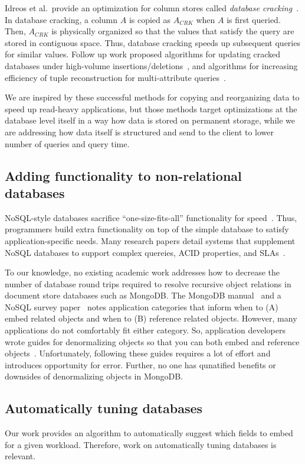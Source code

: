Idreos et al.~provide an optimization for column stores called {\em database cracking}~\cite{Pirk2007}.
In database cracking, a column $A$ is copied as $A_{CRK}$ when $A$ is first queried.
Then, $A_{CRK}$ is physically organized so that the values that satisfy the query are stored in contiguous space.
Thus, database cracking speeds up subsequent queries for similar values.
Follow up work proposed algorithms for updating cracked databases under high-volume insertions/deletions~\cite{Idreos2007}, and algorithms for increasing efficiency of tuple reconstruction for multi-attribute queries~\cite{Idreos2009}.

We are inspired by these successful methods for copying and reorganizing data to speed up read-heavy applications, but those methods target optimizations at the database level itself in a way how data is stored on permanent storage, while we are addressing how data itself is structured and send to the client to lower number of queries and query time.

\subsection{Adding functionality to non-relational databases} 

NoSQL-style databases sacrifice ``one-size-fits-all'' functionality for speed~\cite{Strauch}.
Thus, programmers build extra functionality on top of the simple database to satisfy application-specific needs.
Many research papers detail systems that supplement NoSQL databases to support complex quereies, ACID properties, and SLAs~\cite{Decandia2007,Chang,Beaver2010,Baker}. 

To our knowledge, no existing academic work addresses how to decrease the number of database round trips required to resolve recursive object relations in document store databases such as MongoDB.
The MongoDB manual~\cite{MongoDB2014} and a NoSQL survey paper~\cite{Strauch} notes application categories that inform when to (A) embed related objects and when to (B) reference related objects.
However, many applications do not comfortably fit either category.
So, application developers wrote guides for denormalizing objects so that you can both embed and reference objects~\cite{Wanschik2010}.
Unfortunately, following these guides requires a lot of effort and introduces opportunity for error.
Further, no one has qunatified benefits or downsides of denormalizing objects in MongoDB.

\subsection{Automatically tuning databases}
Our work provides an algorithm to automatically suggest which fields to embed for a given workload. 
Therefore, work on automatically tuning databases is relevant. 

